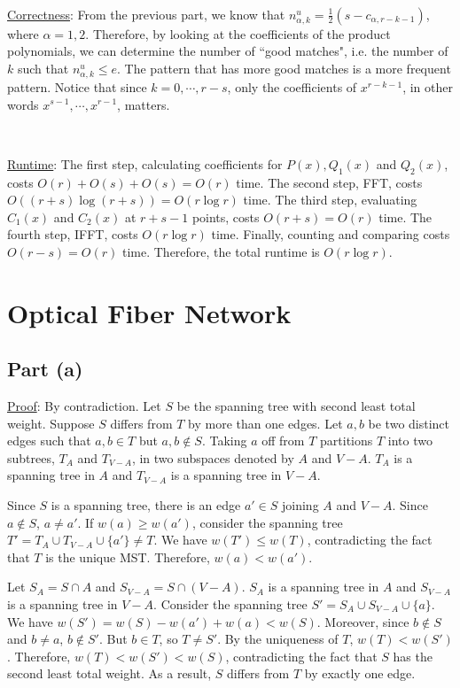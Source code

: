 \documentclass{article}
\begin{document}
~

\noindent\underline{Correctness}: From the previous part, we know that $n^u_{\alpha,k}=\frac{1}{2}(s-c_{\alpha,r-k-1})$, where $\alpha=1,2$. Therefore, by looking at the coefficients of the product polynomials, we can determine the number of ``good matches", i.e. the number of $k$ such that $n^u_{\alpha,k}\leqslant e$. The pattern that has more good matches is a more frequent pattern. Notice that since $k=0,\cdots,r-s$, only the coefficients of $x^{r-k-1}$, in other words $x^{s-1},\cdots,x^{r-1}$, matters.

~

\noindent\underline{Runtime}: The first step, calculating coefficients for $P(x),Q_1(x)$ and $Q_2(x)$, costs $O(r)+O(s)+O(s)=O(r)$ time. The second step, FFT, costs $O((r+s)\log(r+s))=O(r\log r)$ time. The third step, evaluating $C_1(x)$ and $C_2(x)$ at $r+s-1$ points, costs $O(r+s)=O(r)$ time. The fourth step, IFFT, costs $O(r\log r)$ time. Finally, counting and comparing costs $O(r-s)=O(r)$ time. Therefore, the total runtime is $O(r\log r)$.

\section{Optical Fiber Network}
\subsection{Part (a)}
\noindent\underline{Proof}: By contradiction. Let $S$ be the spanning tree with second least total weight. Suppose $S$ differs from $T$ by more than one edges. Let $a,b$ be two distinct edges such that $a,b\in T$ but $a,b\notin S$. Taking $a$ off from $T$ partitions $T$ into two subtrees, $T_A$ and $T_{V-A}$, in two subspaces denoted by $A$ and $V-A$. $T_A$ is a spanning tree in $A$ and $T_{V-A}$ is a spanning tree in $V-A$.

Since $S$ is a spanning tree, there is an edge $a'\in S$ joining $A$ and $V-A$. Since $a\notin S$, $a\neq a'$. If $w(a)\geqslant w(a')$, consider the spanning tree $T'=T_A\cup T_{V-A}\cup\{a'\}\neq T$. We have $w(T')\leqslant w(T)$, contradicting the fact that $T$ is the unique MST. Therefore, $w(a)<w(a')$.

Let $S_A=S\cap A$ and $S_{V-A}=S\cap(V-A)$. $S_A$ is a spanning tree in $A$ and $S_{V-A}$ is a spanning tree in $V-A$. Consider the spanning tree $S'=S_A\cup S_{V-A}\cup\{a\}$. We have $w(S')=w(S)-w(a')+w(a)<w(S)$. Moreover, since $b\notin S$ and $b\neq a$, $b\notin S'$. But $b\in T$, so $T\neq S'$. By the uniqueness of $T$, $w(T)<w(S')$. Therefore, $w(T)<w(S')<w(S)$, contradicting the fact that $S$ has the second least total weight. As a result, $S$ differs from $T$ by exactly one edge.
\end{document}
